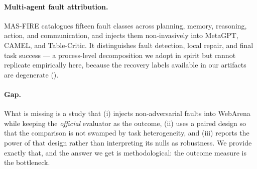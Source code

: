 \paragraph{Multi-agent fault attribution.}
MAS-FIRE \citep{wang2025masfire} catalogues fifteen fault classes across planning,
memory, reasoning, action, and communication, and injects them non-invasively
into MetaGPT, CAMEL, and Table-Critic. It distinguishes fault detection, local
repair, and final task success --- a process-level decomposition we adopt in
spirit but cannot replicate empirically here, because the recovery labels
available in our artifacts are degenerate ().

\paragraph{Gap.}
What is missing is a study that (i) injects non-adversarial faults into WebArena
while keeping the \emph{official} evaluator as the outcome, (ii) uses a paired
design so that the comparison is not swamped by task heterogeneity, and
(iii) reports the power of that design rather than interpreting its nulls as
robustness. We provide exactly that, and the answer we get is methodological: the
outcome measure is the bottleneck.
